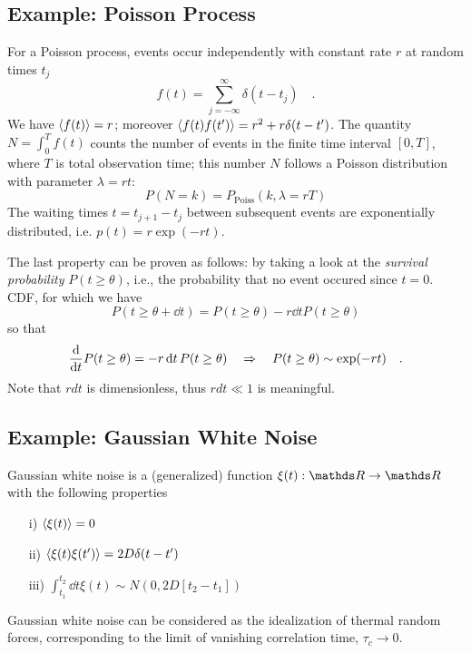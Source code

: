 \documentclass{notebook}
\begin{document}
\subsection*{Example: Poisson Process}
%
\begin{theorem}
	For a Poisson process, events occur independently with constant rate $r$ at random times $t_j$
	\begin{equation}
	f(t) = \sum_{j = -\infty}^{\infty}{\delta(t-t_j)} \quad.
	\end{equation}
	We have $\expval{f(t)} = r$; moreover $\expval{f(t)f(t')} = r^2 + r\delta(t-t')$.
	The quantity $N = \int_0^T f(t)$ counts the number of events in the finite time interval $[0,T]$, 
	where $T$ is total observation time; this number $N$ follows a Poisson distribution with parameter $\lambda = rt$:
	\begin{equation}
		P(N=k) = P_\mathrm{Poiss}(k, \lambda = r T)
	\end{equation}
	The waiting times $t = t_{j+1} - t_j$ between subsequent events are exponentially distributed, 
	i.e. $p(t) = r \exp(-rt)$. 
\end{theorem}
%
The last property can be proven as follows: 
by taking a look at the \textit{survival probability} $P(t \geq \theta)$, 
i.e., the probability that no event occured since $t=0$.
CDF, for which we have 
\begin{equation*}
	P(t \geq \theta + \dd{t}) = P(t \geq \theta) - r \dd{t} P(t \geq \theta)
\end{equation*}
so that
\begin{equation*}
	\dv{t} P(t \geq \theta) = - r \dd{t} P(t \geq \theta) \quad \Rightarrow \quad P(t \geq \theta) \sim \exp(-r t) \quad.
\end{equation*}
Note that $r dt$ is dimensionless, thus $r dt \ll 1$ is meaningful. 


\subsection*{Example: Gaussian White Noise}

%
\begin{theorem}
	Gaussian white noise is a (generalized) function $\xi(t):\R \to \R$ with the following properties
	\begin{itemize}
		\item[i)]{$\expval{\xi(t)} = 0$}
		\item[ii)]{$\expval{\xi(t) \xi(t')} = 2D \delta(t-t')$}
		\item[iii)]{$\int_{t_1}^{t_2} \dd{t} \xi(t) \sim N(0,2D[t_2-t_1])$}
	\end{itemize}
	Gaussian white noise can be considered as the idealization of thermal random forces, corresponding to the limit of vanishing correlation time, $\tau_c \to 0$.
\end{theorem}
%
\end{document}
